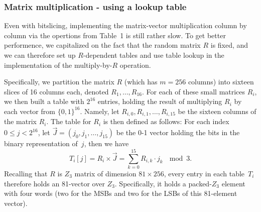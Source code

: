 \subsubsection{Matrix multiplication - using a lookup table}

Even with bitslicing, implementing the matrix-vector multiplication column by column via the opertions from Table~1 is still rather slow.
To get better performence, we capitalized on the fact that the random matrix $R$ is fixed, and we can therefore set up $R$-dependent tables and use table lookup in the implementation of the multiply-by-$R$ operation.

Specifically, we partition the matrix $R$ (which has $m=256$ columns) into sixteen slices of 16 columns each, denoted $R_1,\ldots,R_{16}$.
For each of these small matrices $R_i$, we then built a table with $2^{16}$ entries, holding the result of multiplying $R_i$ by each vector from $\{0,1\}^{16}$.
Namely, let $R_{i,0},R_{i,1},\ldots,R_{i,15}$ be the sixteen columns of the matrix $R_i$.
The table for $R_i$ is then defined as follows: For each index $0\le j < 2^{16}$, let $\vec{J}=(j_0,j_1,\ldots,j_{15})$ be the 0-1 vector holding the bits in the binary representation of~$j$, then we have
\[
T_i[j] = R_i \times \vec{J} = \sum_{k=0}^{15} R_{i,k} \cdot j_k ~~\bmod 3.
\]
Recalling that $R$ is $Z_3$ matrix of dimension $81\times 256$, every entry in each table~$T_i$ therefore holds an 81-vector over $Z_3$.
Specifically, it holds a packed-$Z_3$ element with four words (two for the MSBs and two for the LSBs of this 81-element vector).

